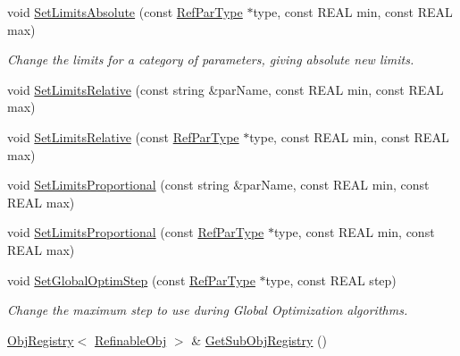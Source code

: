\begin{DoxyCompactItemize}
void \mbox{\hyperlink{class_obj_cryst_1_1_refinable_obj_a371f137ad14a77ee3b545520d05fe4d6}{Set\+Limits\+Absolute}} (const \mbox{\hyperlink{class_obj_cryst_1_1_ref_par_type}{Ref\+Par\+Type}} $\ast$type, const R\+E\+AL min, const R\+E\+AL max)
\begin{DoxyCompactList}\small\item\em Change the limits for a category of parameters, giving absolute new limits. \end{DoxyCompactList}\item 
void \mbox{\hyperlink{class_obj_cryst_1_1_refinable_obj_acacf469614253239fdeebb21e50f0c1c}{Set\+Limits\+Relative}} (const string \&par\+Name, const R\+E\+AL min, const R\+E\+AL max)
\item 
void \mbox{\hyperlink{class_obj_cryst_1_1_refinable_obj_ae8d497fc43ac3f166a21781a62dfa25d}{Set\+Limits\+Relative}} (const \mbox{\hyperlink{class_obj_cryst_1_1_ref_par_type}{Ref\+Par\+Type}} $\ast$type, const R\+E\+AL min, const R\+E\+AL max)
\item 
void \mbox{\hyperlink{class_obj_cryst_1_1_refinable_obj_adc6b05a95d524d600910a47861190e84}{Set\+Limits\+Proportional}} (const string \&par\+Name, const R\+E\+AL min, const R\+E\+AL max)
\item 
void \mbox{\hyperlink{class_obj_cryst_1_1_refinable_obj_a75741a3e7f7f1740243901b60f406e93}{Set\+Limits\+Proportional}} (const \mbox{\hyperlink{class_obj_cryst_1_1_ref_par_type}{Ref\+Par\+Type}} $\ast$type, const R\+E\+AL min, const R\+E\+AL max)
\item 
\mbox{\label{class_obj_cryst_1_1_refinable_obj_ae4f0b5b0038ff3b49dcdc8adbf98bc58}} 
void \mbox{\hyperlink{class_obj_cryst_1_1_refinable_obj_ae4f0b5b0038ff3b49dcdc8adbf98bc58}{Set\+Global\+Optim\+Step}} (const \mbox{\hyperlink{class_obj_cryst_1_1_ref_par_type}{Ref\+Par\+Type}} $\ast$type, const R\+E\+AL step)
\begin{DoxyCompactList}\small\item\em Change the maximum step to use during Global Optimization algorithms. \end{DoxyCompactList}\item 
\mbox{\label{class_obj_cryst_1_1_refinable_obj_a55e54c4b43853cc658f275771645f14a}} 
\mbox{\hyperlink{class_obj_cryst_1_1_obj_registry}{Obj\+Registry}}$<$ \mbox{\hyperlink{class_obj_cryst_1_1_refinable_obj}{Refinable\+Obj}} $>$ \& \mbox{\hyperlink{class_obj_cryst_1_1_refinable_obj_a55e54c4b43853cc658f275771645f14a}{Get\+Sub\+Obj\+Registry}} ()

\end{DoxyCompactItemize}

